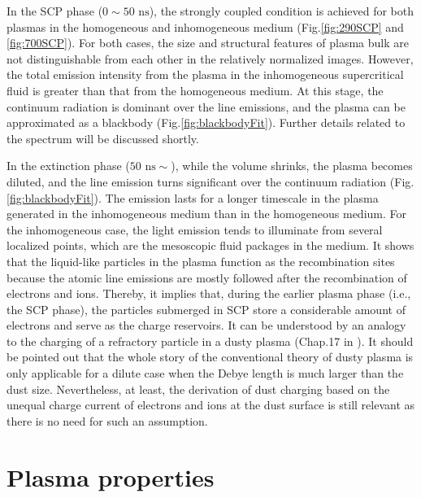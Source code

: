 In the SCP phase ($0 \sim 50 \text{ ns}$), the strongly coupled condition is achieved for both plasmas in the homogeneous and inhomogeneous medium (Fig.\ref{fig:290SCP} and \ref{fig:700SCP}). For both cases, the size and structural features of plasma bulk are not distinguishable from each other in the relatively normalized images. However, the total emission intensity from the plasma in the inhomogeneous supercritical fluid is greater than that from the homogeneous medium. At this stage, the continuum radiation is dominant over the line emissions, and the plasma can be approximated as a blackbody (Fig.\ref{fig:blackbodyFit}). Further details related to the spectrum will be discussed shortly.

In the extinction phase ($50 \text{ ns} \sim$), while the volume shrinks, the plasma becomes diluted, and the line emission turns significant over the continuum radiation (Fig.\ref{fig:blackbodyFit}). The emission lasts for a longer timescale in the plasma generated in the inhomogeneous medium than in the homogeneous medium. For the inhomogeneous case, the light emission tends to illuminate from several localized points, which are the mesoscopic fluid packages in the medium. It shows that the liquid-like particles in the plasma function as the recombination sites because the atomic line emissions are mostly followed after the recombination of electrons and ions. Thereby, it implies that, during the earlier plasma phase (i.e., the SCP phase), the particles submerged in SCP store a considerable amount of electrons and serve as the charge reservoirs. It can be understood by an analogy to the charging of a refractory particle in a dusty plasma (Chap.17 in \cite{bellan2008fundamentals}). It should be pointed out that the whole story of the conventional theory of dusty plasma is only applicable for a dilute case when the Debye length is much larger than the dust size. Nevertheless, at least, the derivation of dust charging based on the unequal charge current of electrons and ions at the dust surface is still relevant as there is no need for such an assumption.



\section{Plasma properties}
\label{sec:ch4-3}

